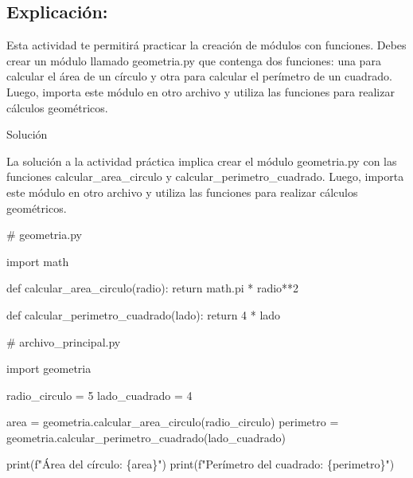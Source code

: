 \documentclass[
  a4paper,
  DIV=11,
  numbers=noendperiod,
  onepage,
  openany]{scrreprt}
\newenvironment{Shaded}{\begin{snugshade}}{\end{snugshade}}
\newcommand{\BuiltInTok}[1]{\textcolor[rgb]{0.00,0.23,0.31}{#1}}
\newcommand{\CommentTok}[1]{\textcolor[rgb]{0.37,0.37,0.37}{#1}}
\newcommand{\ControlFlowTok}[1]{\textcolor[rgb]{0.00,0.23,0.31}{#1}}
\newcommand{\DecValTok}[1]{\textcolor[rgb]{0.68,0.00,0.00}{#1}}
\newcommand{\ImportTok}[1]{\textcolor[rgb]{0.00,0.46,0.62}{#1}}
\newcommand{\KeywordTok}[1]{\textcolor[rgb]{0.00,0.23,0.31}{#1}}
\newcommand{\NormalTok}[1]{\textcolor[rgb]{0.00,0.23,0.31}{#1}}
\newcommand{\OperatorTok}[1]{\textcolor[rgb]{0.37,0.37,0.37}{#1}}
\newcommand{\SpecialCharTok}[1]{\textcolor[rgb]{0.37,0.37,0.37}{#1}}
\newcommand{\SpecialStringTok}[1]{\textcolor[rgb]{0.13,0.47,0.30}{#1}}
\begin{document}
\subsection{Explicación:}\label{explicaciuxf3n-45}

Esta actividad te permitirá practicar la creación de módulos con
funciones. Debes crear un módulo llamado geometria.py que contenga dos
funciones: una para calcular el área de un círculo y otra para calcular
el perímetro de un cuadrado. Luego, importa este módulo en otro archivo
y utiliza las funciones para realizar cálculos geométricos.

Solución

La solución a la actividad práctica implica crear el módulo geometria.py
con las funciones calcular\_area\_circulo y
calcular\_perimetro\_cuadrado. Luego, importa este módulo en otro
archivo y utiliza las funciones para realizar cálculos geométricos.

\begin{Shaded}
\begin{Highlighting}[]
\CommentTok{\# geometria.py}

\ImportTok{import}\NormalTok{ math}

\KeywordTok{def}\NormalTok{ calcular\_area\_circulo(radio):}
    \ControlFlowTok{return}\NormalTok{ math.pi }\OperatorTok{*}\NormalTok{ radio}\OperatorTok{**}\DecValTok{2}

\KeywordTok{def}\NormalTok{ calcular\_perimetro\_cuadrado(lado):}
    \ControlFlowTok{return} \DecValTok{4} \OperatorTok{*}\NormalTok{ lado}
\end{Highlighting}
\end{Shaded}

\begin{Shaded}
\begin{Highlighting}[]
\CommentTok{\# archivo\_principal.py}

\ImportTok{import}\NormalTok{ geometria}

\NormalTok{radio\_circulo }\OperatorTok{=} \DecValTok{5}
\NormalTok{lado\_cuadrado }\OperatorTok{=} \DecValTok{4}

\NormalTok{area }\OperatorTok{=}\NormalTok{ geometria.calcular\_area\_circulo(radio\_circulo)}
\NormalTok{perimetro }\OperatorTok{=}\NormalTok{ geometria.calcular\_perimetro\_cuadrado(lado\_cuadrado)}

\BuiltInTok{print}\NormalTok{(}\SpecialStringTok{f"Área del círculo: }\SpecialCharTok{\{}\NormalTok{area}\SpecialCharTok{\}}\SpecialStringTok{"}\NormalTok{)}
\BuiltInTok{print}\NormalTok{(}\SpecialStringTok{f"Perímetro del cuadrado: }\SpecialCharTok{\{}\NormalTok{perimetro}\SpecialCharTok{\}}\SpecialStringTok{"}\NormalTok{)}
\end{Highlighting}
\end{Shaded}
\end{document}

